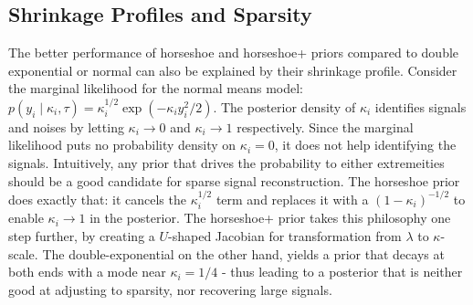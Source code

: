 \documentclass[11pt]{article}
\numberwithin{equation}{section}
\begin{document}
%

\subsection{Shrinkage Profiles and Sparsity}

The better performance of horseshoe and horseshoe+ priors compared to double exponential or normal can also be explained by their shrinkage profile. Consider the marginal likelihood for the normal means model: $p(y_i \mid \kappa_i, \tau) = \kappa_i^{1/2} \exp \left(-\kappa_i y_i^2/2 \right)$. The posterior density of $\kappa_i$ identifies signals and noises by letting $\kappa_i \to 0$ and $\kappa_i \to 1$ respectively. Since the marginal likelihood puts no probability density on $\kappa_i = 0$, it does not help identifying the signals. Intuitively, any prior that drives the probability to either extremeities should be a good candidate for sparse signal reconstruction. The horseshoe prior does exactly that: it cancels the $\kappa_i^{1/2}$ term and replaces it with a $(1-\kappa_i)^{-1/2}$ to enable $\kappa_i \to 1$ in the posterior. The horseshoe+ prior takes this philosophy one step further, by creating a $U$-shaped Jacobian for transformation from $\lambda$ to $\kappa$-scale. The double-exponential on the other hand, yields a prior that decays at both ends with a mode near $\kappa_i = 1/4$ - thus leading to a posterior that is neither good at adjusting to sparsity, nor recovering large signals. 
\end{document}

